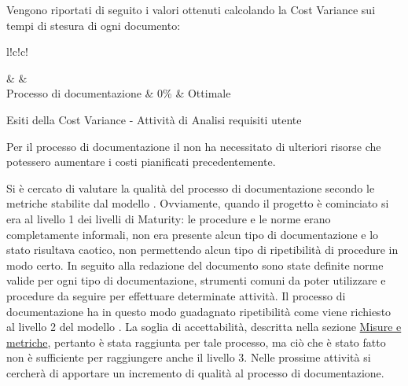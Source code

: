 \documentclass[a4paper, titlepage]{article}
\begin{document}
Vengono riportati di seguito i valori ottenuti calcolando la Cost Variance sui tempi di stesura di ogni documento:
\begin{tabella}{l!{\VRule}c!{\VRule}c!{\VRule}}
	
	\color{white}  & \color{white}  &\color{white}  \\
	\endfirsthead
	Processo di documentazione & 0\% & Ottimale\\
	\caption{Esiti della Cost Variance - Attività di Analisi requisiti utente}	   	
\end{tabella}

 Per il processo di documentazione il  non ha necessitato di ulteriori risorse che potessero aumentare i costi pianificati precedentemente.

Si è cercato di valutare la qualità del processo di documentazione secondo le metriche stabilite dal modello  . Ovviamente, quando il progetto è cominciato si era al livello 1 dei livelli di Maturity: le procedure e le norme erano completamente informali, non era presente alcun tipo di documentazione e lo stato risultava caotico, non permettendo alcun tipo di ripetibilità di procedure in modo certo.
\newline In seguito alla redazione del documento \NdPdoc sono state definite  norme valide per ogni tipo di documentazione, strumenti comuni
da poter utilizzare e procedure da seguire per effettuare determinate attività. Il processo di documentazione ha in questo modo guadagnato ripetibilità come viene richiesto al livello 2 del modello .
\newline La soglia di accettabilità, descritta nella sezione \hyperref[sec:metr]{Misure e metriche}, pertanto è stata raggiunta per tale processo, ma ciò che è stato fatto non è sufficiente per raggiungere anche il livello 3.
\newline Nelle prossime attività si cercherà di apportare un incremento di qualità al processo di documentazione.
\end{document}
